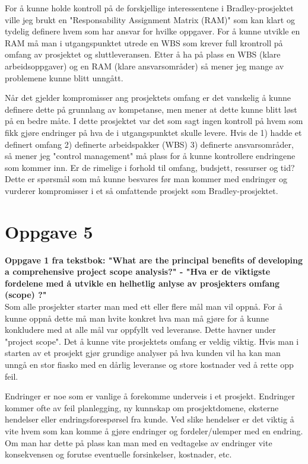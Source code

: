 	For å kunne holde kontroll på de forskjellige interessentene i Bradley-prosjektet ville
	jeg brukt en "Responsability Assignment Matrix (RAM)" som kan klart og tydelig definere
	hvem som har ansvar for hvilke oppgaver. For å kunne utvikle en RAM må man i utgangspunktet
	utrede en WBS som krever full krontroll på omfang av prosjektet og sluttleveransen.
	Etter å ha på plass en WBS (klare arbeidsoppgaver) og en RAM (klare ansvarsområder) så mener
	jeg mange av problemene kunne blitt unngått. 

	Når det gjelder kompromisser ang prosjektets omfang er det vanskelig å kunne definere dette
	på grunnlang av kompetanse, men mener at dette kunne blitt løst på en bedre måte. 
	I dette prosjektet var det som sagt ingen kontroll på hvem som fikk gjøre endringer
	på hva de i utgangspunktet skulle levere. Hvis de 1) hadde et definert omfang 2) definerte
	arbeidspakker (WBS) 3) definerte ansvarsområder, så mener jeg "control management" må 
	plass for å kunne kontrollere endringene som kommer inn. Er de rimelige i forhold
	til omfang, budsjett, ressurser og tid? Dette er spørsmål som må kunne besvares før
	man kommer med endringer og vurderer kompromisser i et så omfattende prosjekt som
	Bradley-prosjektet. 



\clearpage
\section*{Oppgave 5}
	{\bf Oppgave 1 fra tekstbok: "What are the principal benefits of developing a comprehensive
	project scope analysis?" - "Hva er de viktigste fordelene med å utvikle en helhetlig anlyse 
	av prosjekters omfang (scope) ?"} \\

		Som alle prosjekter starter man med ett eller flere mål man vil oppnå. For å 
		kunne oppnå dette må man hvite konkret hva man må gjøre for å kunne konkludere
		med at alle mål var oppfyllt ved leveranse. Dette havner under "project scope".
		Det å kunne vite prosjektets omfang er veldig viktig. Hvis man i starten av 
		et prosjekt gjør grundige analyser på hva kunden vil ha kan man unngå en stor
		fiasko med en dårlig leveranse og store kostnader ved å rette opp feil. 

		Endringer er noe som er vanlige å forekomme underveis i et prosjekt. Endringer
		kommer ofte av feil planlegging, ny kunnskap om prosjektdomene, eksterne hendelser
		eller endringsforespørsel fra kunde. Ved slike hendelser er det viktig å vite 
		hvem som kan komme å gjøre endringer og fordeler/ulemper med en endring. Om man 
		har dette på plass kan man med en vedtagelse av endringer vite konsekvensen og 
		forutse eventuelle forsinkelser, kostnader, etc. 

